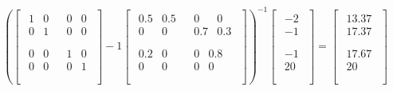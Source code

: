\begin{equation}
  \left(\left[\begin{matrix}\begin{matrix}1&0\\0&1\\\end{matrix}&\begin{matrix}0&0\\0&0\\\end{matrix}\\\begin{matrix}0&0\\0&0\\\end{matrix}&\begin{matrix}1&0\\0&1\\\end{matrix}\\\end{matrix}\right]-1\left[\begin{matrix}\begin{matrix}0.5&0.5\\0&0\\\end{matrix}&\begin{matrix}0&0\\0.7&0.3\\\end{matrix}\\\begin{matrix}0.2&0\\0&0\\\end{matrix}&\begin{matrix}0&0.8\\0&0\\\end{matrix}\\\end{matrix}\right]\right)^{-1}\left[\begin{matrix}\begin{matrix}-2\\-1\\\end{matrix}\\\begin{matrix}-1\\20\\\end{matrix}\\\end{matrix}\right]=\left[\begin{matrix}\begin{matrix}13.37\\17.37\\\end{matrix}\\\begin{matrix}17.67\\20\\\end{matrix}\\\end{matrix}\right]  
\end{equation}


